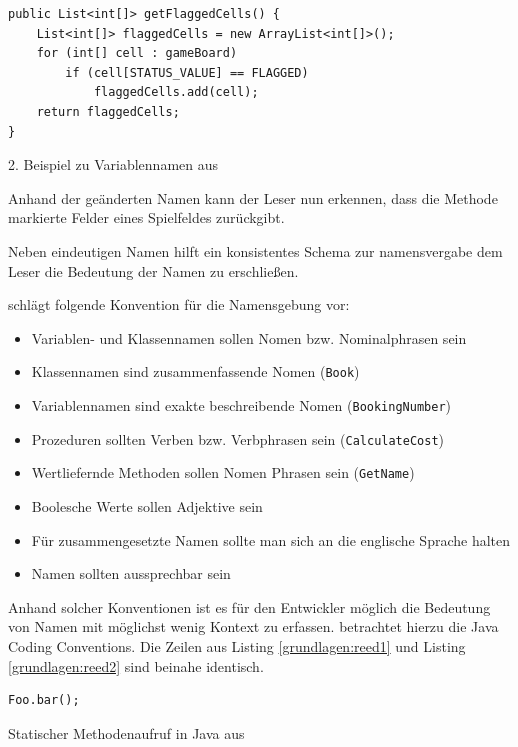 \begin{listing}
    \begin{verbatim}
public List<int[]> getFlaggedCells() {
    List<int[]> flaggedCells = new ArrayList<int[]>();
    for (int[] cell : gameBoard)
        if (cell[STATUS_VALUE] == FLAGGED)
            flaggedCells.add(cell);
    return flaggedCells;
}
    \end{verbatim}
    \caption{2. Beispiel zu Variablennamen aus \cite[S. 47]{Martin}}
    \label{grundlagen:naminggood}
\end{listing}

Anhand der geänderten Namen kann der Leser nun erkennen, dass die Methode markierte Felder eines Spielfeldes zurückgibt.

Neben eindeutigen Namen hilft ein konsistentes Schema zur namensvergabe dem Leser die Bedeutung der Namen zu erschließen. 

\cite[S. 4]{Green} schlägt folgende Konvention für die Namensgebung vor:
\begin{itemize}
	\item Variablen- und Klassennamen sollen Nomen bzw. Nominalphrasen sein
	\item Klassennamen sind zusammenfassende Nomen (\texttt{Book})
	\item Variablennamen sind exakte beschreibende Nomen (\texttt{BookingNumber})
	\item Prozeduren sollten Verben bzw. Verbphrasen sein (\texttt{CalculateCost})
	\item Wertliefernde Methoden sollen Nomen Phrasen sein (\texttt{GetName}) 
	\item Boolesche Werte sollen Adjektive sein
	\item Für zusammengesetzte Namen sollte man sich an die englische Sprache halten
	\item Namen sollten aussprechbar sein
\end{itemize}

Anhand solcher Konventionen ist es für den Entwickler möglich die Bedeutung von Namen mit möglichst wenig Kontext zu erfassen.
\cite{reed} betrachtet hierzu die Java Coding Conventions. Die Zeilen aus Listing \ref{grundlagen:reed1} und
Listing \ref{grundlagen:reed2} sind beinahe identisch. 

\begin{listing}
    \begin{verbatim}
Foo.bar();
    \end{verbatim}
    \caption{Statischer Methodenaufruf in Java aus \cite[S. 182]{reed}}
    \label{grundlagen:reed1}
\end{listing}

